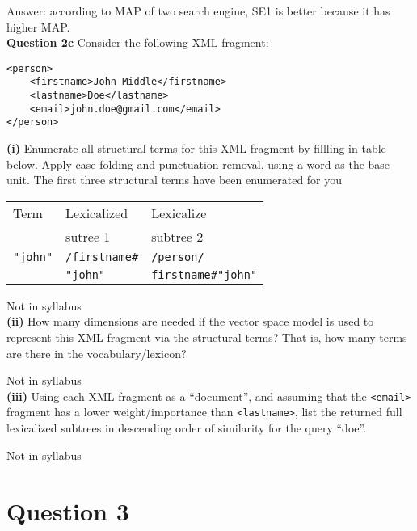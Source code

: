 \documentclass[11pt,a4paper]{report}
\begin{document}
\begin{multicols*}{2}
\noindent Answer: according to MAP of two search engine, SE1 is better because it has higher MAP. \\

\noindent \textbf{Question 2c} Consider the following XML fragment:

\begin{verbatim}
<person>
    <firstname>John Middle</firstname>
    <lastname>Doe</lastname>
    <email>john.doe@gmail.com</email>
</person>
\end{verbatim}

\noindent \textbf{(i)} Enumerate \underline{all} structural terms for this XML fragment by fillling in table below. Apply case-folding and punctuation-removal, using a word as the base unit. The first three structural terms have been enumerated for you

\begin{center}
\begin{tabular}{| l | l | l |}
    \hline
    Term & Lexicalized & Lexicalize \\
         & sutree 1    & subtree 2  \\
    \hline
    \verb|"john"| & \verb|/firstname#| & \verb|/person/|\\
                  & \verb|"john"|      & \verb|firstname#"john"| \\
    \hline
\end{tabular}
\end{center}

\noindent Not in syllabus\\

\noindent \textbf{(ii)} How many dimensions are needed if the vector space model is used to represent this XML fragment via the structural terms? That is, how many terms are there in the vocabulary/lexicon?

\noindent Not in syllabus\\

\noindent \textbf{(iii)} Using each XML fragment as a ``document'', and assuming that the \verb|<email>| fragment has a lower weight/importance than \verb|<lastname>|, list the returned full lexicalized subtrees in descending order of similarity for the query ``doe''.

\noindent Not in syllabus

\section{Question 3}


\end{multicols*}
\end{document}
